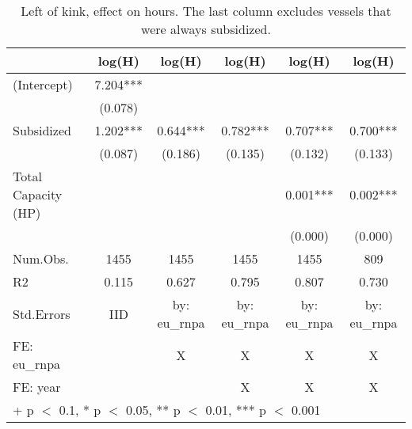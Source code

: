 \begin{table}

\caption{\label{tab:}Left of kink, effect on hours. The last column excludes vessels that were always subsidized.}
\centering
\begin{tabular}[t]{lccccc}
\toprule
  & log(H) & log(H)  & log(H)   & log(H)    & log(H)    \\
\midrule
(Intercept) & \num{7.204}*** &  &  &  & \\
 & (\num{0.078}) &  &  &  & \\
Subsidized & \num{1.202}*** & \num{0.644}*** & \num{0.782}*** & \num{0.707}*** & \num{0.700}***\\
 & (\num{0.087}) & (\num{0.186}) & (\num{0.135}) & (\num{0.132}) & (\num{0.133})\\
Total Capacity (HP) &  &  &  & \num{0.001}*** & \num{0.002}***\\
 &  &  &  & (\num{0.000}) & (\num{0.000})\\
\midrule
Num.Obs. & \num{1455} & \num{1455} & \num{1455} & \num{1455} & \num{809}\\
R2 & \num{0.115} & \num{0.627} & \num{0.795} & \num{0.807} & \num{0.730}\\
Std.Errors & IID & by: eu\_rnpa & by: eu\_rnpa & by: eu\_rnpa & by: eu\_rnpa\\
FE: eu_rnpa &  & X & X & X & X\\
FE: year &  &  & X & X & X\\
\bottomrule
\multicolumn{6}{l}{\rule{0pt}{1em}+ p $<$ 0.1, * p $<$ 0.05, ** p $<$ 0.01, *** p $<$ 0.001}\\
\end{tabular}
\end{table}

